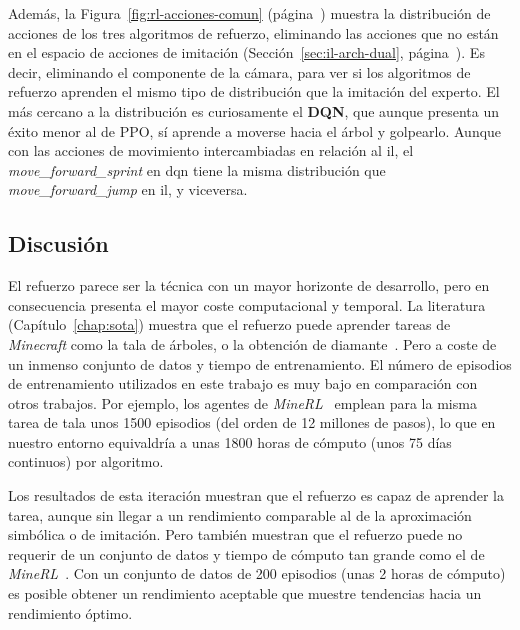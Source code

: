 Además, la Figura~\ref{fig:rl-acciones-comun} (página~\pageref{fig:rl-acciones-comun}) 
muestra la distribución de acciones de los tres algoritmos de refuerzo, eliminando las acciones que no están en el espacio
de acciones de imitación (Sección~\ref{sec:il-arch-dual}, página~\pageref{sec:il-arch-dual}). Es decir, eliminando el componente
de la cámara, para ver si los algoritmos de refuerzo aprenden el mismo tipo de distribución que
la imitación del experto. El más cercano a la distribución es curiosamente el \textbf{DQN}, 
que aunque presenta un éxito menor al de PPO, sí aprende a moverse hacia el árbol y golpearlo.
Aunque con las acciones de movimiento intercambiadas en relación al \gls{il}, el 
\textit{move\_forward\_sprint} en \gls{dqn} tiene la misma distribución que
\textit{move\_forward\_jump} en \gls{il}, y viceversa.  

\subsection{Discusión}
El refuerzo parece ser la técnica con un mayor horizonte de desarrollo, pero en consecuencia
presenta el mayor coste computacional y temporal. La literatura (Capítulo~\ref{chap:sota}) 
muestra que el refuerzo puede aprender tareas de \textit{Minecraft} como la tala de árboles,
o la obtención de diamante~\cite{guss2019minerl}. Pero a coste de un inmenso conjunto de datos y tiempo de entrenamiento.
El número de episodios de entrenamiento utilizados en este trabajo es muy bajo en comparación con
otros trabajos. Por ejemplo, los agentes de \textit{MineRL}~\cite{guss2019minerl} emplean para la misma tarea 
de tala unos \num{1500} episodios (del orden de \num{12} millones de pasos), lo que en nuestro entorno equivaldría a unas
\num{1800} horas de cómputo (unos \num{75} días continuos) por algoritmo.

Los resultados de esta iteración muestran que el refuerzo es capaz de aprender la tarea, aunque
sin llegar a un rendimiento comparable al de la aproximación simbólica o de imitación. Pero también muestran 
que el refuerzo puede no requerir de un conjunto de datos y
tiempo de cómputo tan grande como el de \textit{MineRL}~\cite{guss2019minerl}. Con un conjunto de datos de 
\num{200} episodios (unas \num{2} horas de cómputo) es posible obtener un rendimiento aceptable
que muestre tendencias hacia un rendimiento óptimo.